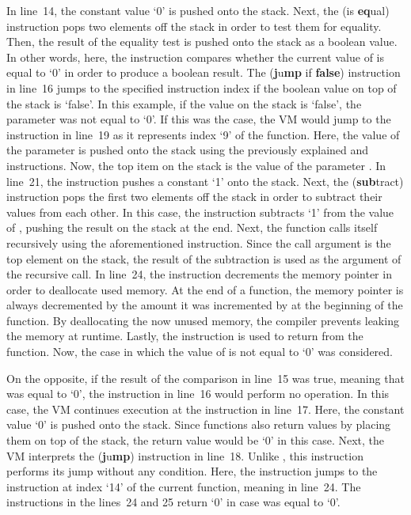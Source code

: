 In line~14, the constant value `0' is pushed onto the stack.
Next, the  (is \textbf{eq}ual) instruction pops two elements off the stack in order to test them for equality.
Then, the result of the equality test is pushed onto the stack as a boolean value.
In other words, here, the instruction compares whether the current value of  is equal to `0' in order to produce a boolean result.
The  (\textbf{j}u\textbf{mp} if \textbf{false}) instruction in line~16 jumps to the specified instruction index if the boolean value on top of the stack is `false'.
In this example, if the value on the stack is `false', the parameter  was not equal to `0'.
If this was the case, the VM would jump to the instruction in line~19 as it represents index `9' of the  function.
Here, the value of the parameter  is pushed onto the stack using the previously explained  and  instructions.
Now, the top item on the stack is the value of the parameter .
In line~21, the  instruction pushes a constant `1' onto the stack.
Next, the  (\textbf{sub}tract) instruction pops the first two elements off the stack in order to subtract their values from each other.
In this case, the instruction subtracts `1' from the value of , pushing the result on the stack at the end.
Next, the  function calls itself recursively using the aforementioned  instruction.
Since the call argument is the top element on the stack, the result of the subtraction is used as the argument of the recursive call.
In line~24, the  instruction decrements the memory pointer in order to deallocate used memory.
At the end of a function, the memory pointer is always decremented by the amount it was incremented by at the beginning of the function.
By deallocating the now unused memory, the compiler prevents leaking the memory at runtime.
Lastly, the  instruction is used to return from the  function.
Now, the case in which the value of  is not equal to `0' was considered.

On the opposite, if the result of the comparison in line~15 was true, meaning that  was equal to `0', the  instruction in line~16 would perform no operation.
In this case, the VM continues execution at the  instruction in line~17.
Here, the constant value `0' is pushed onto the stack.
Since functions also return values by placing them on top of the stack, the return value would be `0' in this case.
Next, the VM interprets the  (\textbf{j}u\textbf{mp}) instruction in line~18.
Unlike , this instruction performs its jump without any condition.
Here, the instruction jumps to the instruction at index `14' of the current function, meaning  in line~24.
The instructions in the lines~24 and 25 return `0' in case  was equal to `0'.

